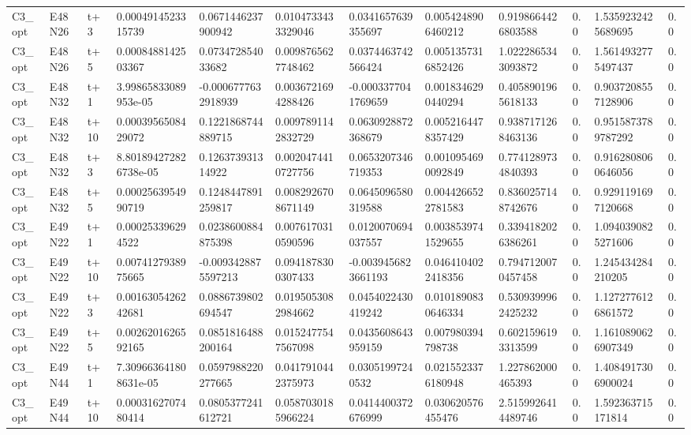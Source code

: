\begin{landscape}
\begin{longtable}{llllllllllll}
C3\_opt & E48N26 & t+3 & 0.0004914523315739 & 0.0671446237900942 & 0.0104733433329046 & 0.0341657639355697 & 0.0054248906460212 & 0.9198664426803588 & 0.0 & 1.5359232425689695 & 0.0 \\
C3\_opt & E48N26 & t+5 & 0.0008488142503367 & 0.073472854033682 & 0.0098765627748462 & 0.0374463742566424 & 0.0051357316852426 & 1.0222865343093872 & 0.0 & 1.5614932775497437 & 0.0 \\
C3\_opt & E48N32 & t+1 & 3.99865833089953e-05 & -0.0006777632918939 & 0.0036721694288426 & -0.0003377041769659 & 0.0018346290440294 & 0.4058901965618133 & 0.0 & 0.9037208557128906 & 0.0 \\
C3\_opt & E48N32 & t+10 & 0.0003956508429072 & 0.1221868744889715 & 0.0097891142832729 & 0.0630928872368679 & 0.0052164478357429 & 0.9387171268463136 & 0.0 & 0.9515873789787292 & 0.0 \\
C3\_opt & E48N32 & t+3 & 8.801894272826738e-05 & 0.126373931314922 & 0.0020474410727756 & 0.0653207346719353 & 0.0010954690092849 & 0.7741289734840393 & 0.0 & 0.9162808060646056 & 0.0 \\
C3\_opt & E48N32 & t+5 & 0.0002563954990719 & 0.1248447891259817 & 0.0082926708671149 & 0.0645096580319588 & 0.0044266522781583 & 0.8360257148742676 & 0.0 & 0.9291191697120668 & 0.0 \\
C3\_opt & E49N22 & t+1 & 0.000253396294522 & 0.0238600884875398 & 0.0076170310590596 & 0.0120070694037557 & 0.0038539741529655 & 0.3394182026386261 & 0.0 & 1.0940390825271606 & 0.0 \\
C3\_opt & E49N22 & t+10 & 0.0074127938975665 & -0.0093428875597213 & 0.0941878300307433 & -0.0039456823661193 & 0.0464104022418356 & 0.7947120070457458 & 0.0 & 1.245434284210205 & 0.0 \\
C3\_opt & E49N22 & t+3 & 0.0016305426242681 & 0.0886739802694547 & 0.0195053082984662 & 0.0454022430419242 & 0.0101890830646334 & 0.5309399962425232 & 0.0 & 1.1272776126861572 & 0.0 \\
C3\_opt & E49N22 & t+5 & 0.0026201626592165 & 0.0851816488200164 & 0.0152477547567098 & 0.0435608643959159 & 0.007980394798738 & 0.6021596193313599 & 0.0 & 1.1610890626907349 & 0.0 \\
C3\_opt & E49N44 & t+1 & 7.309663641808631e-05 & 0.0597988220277665 & 0.0417910442375973 & 0.03051997240532 & 0.0215523376180948 & 1.227862000465393 & 0.0 & 1.4084917306900024 & 0.0 \\
C3\_opt & E49N44 & t+10 & 0.0003162707480414 & 0.0805377241612721 & 0.0587030185966224 & 0.0414400372676999 & 0.030620576455476 & 2.5159926414489746 & 0.0 & 1.592363715171814 & 0.0 \\

\end{longtable}
\end{landscape}
